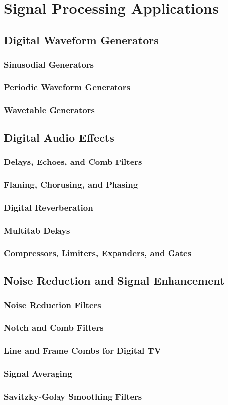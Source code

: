 \section{Signal Processing Applications}
\subsection{Digital Waveform Generators}
\subsubsection{Sinusodial Generators}
\subsubsection{Periodic Waveform Generators}
\subsubsection{Wavetable Generators}

\subsection{Digital Audio Effects}
\subsubsection{Delays, Echoes, and Comb Filters}
\subsubsection{Flaning, Chorusing, and Phasing}
\subsubsection{Digital Reverberation}
\subsubsection{Multitab Delays}
\subsubsection{Compressors, Limiters, Expanders, and Gates}

\subsection{Noise Reduction and Signal Enhancement}
\subsubsection{Noise Reduction Filters}
\subsubsection{Notch and Comb Filters}
\subsubsection{Line and Frame Combs for Digital TV}
\subsubsection{Signal Averaging}
\subsubsection{Savitzky-Golay Smoothing Filters}


